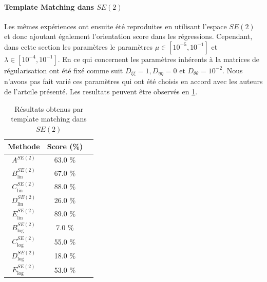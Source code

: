 \documentclass{article}
\begin{document}
\paragraph{Template Matching dans $SE(2)$}
Les mêmes expériences ont ensuite été reproduites en utilisant l'espace $SE(2)$ et donc ajoutant également l'orientation score dans les régressions.
Cependant, dans cette section les paramètres le paramètres $\mu \in [10^{-5}, 10^{-1}]$ et $\lambda \in [10^{-4}, 10^{-1}]$. En ce qui concernent les paramètres inhérents à la matrices de 
régularisation ont été fixé comme suit $D_{\xi \xi}=1, D_{\eta \eta} = 0$ et $D_{\theta \theta} = 10^{-2}$. Nous n'avons pas fait varié ces paramètres qui ont été choisis en accord avec les auteurs 
de l'artcile présenté. Les resultats peuvent être observés en \ref{table: SE(2)}.

\begin{table}[h!]
    \centering
    \begin{tabular}{|c|c|c|}
        \hline
        Methode & Score (\%)\\
        \hline
        \hline
        $A^{SE(2)}$&  63.0 \% \\
        \hline
        $B_{\text{lin}}^{SE(2)}$&  67.0    \%   \\
        $C_{\text{lin}}^{SE(2)}$&  88.0    \%   \\
        $D_{\text{lin}}^{SE(2)}$&  26.0   \%   \\
        $E_{\text{lin}}^{SE(2)}$&  89.0    \%   \\
        \hline
        $B_{\text{log}}^{SE(2)} $&  7.0  \%   \\ 
        $C_{\text{log}}^{SE(2)} $&  55.0  \%   \\ 
        $D_{\text{log}}^{SE(2)} $&  18.0 \%   \\ 
        $E_{\text{log}}^{SE(2)} $&  53.0  \%   \\ 
        \hline
    \end{tabular}
    \caption{Résultats obtenus par template matching dans $SE(2)$}
    \label{table: SE(2)}
\end{table}
\end{document}
